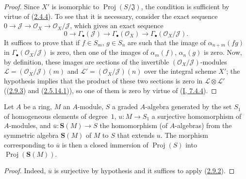 
\begin{proof}
Since $X'$ is isomorphic to $\operatorname{Proj}(S/\mathfrak{J})$, the
condition is sufficient by virtue of (\hyperref[II.2.4.4]{2.4.4}). To see
that it is necessary, consider the exact sequence
$0\to\mathcal{J}\to\mathcal{O}_X\to\mathcal{O}_X/\mathcal{J}$, which gives an
exact sequence
\[
  0\longrightarrow\Gamma_\bullet(\mathcal{J})
  \longrightarrow\Gamma_\bullet(\mathcal{O}_X)
  \longrightarrow\Gamma_\bullet(\mathcal{O}_X/\mathcal{J}).
\]
It suffices to prove that if $f\in S_m$, $g\in S_n$ are such that the image of
$\alpha_{n+m}(fg)$ in $\Gamma_\bullet(\mathcal{O}_X/\mathcal{J})$ is zero,
then one of the images of $\alpha_m(f)$, $\alpha_n(g)$ is zero. Now, by
definition, these images are sections of the invertible
$(\mathcal{O}_X/\mathcal{J})$-modules
$\mathcal{L}=(\mathcal{O}_X/\mathcal{J})(m)$ and
$\mathcal{L}'=(\mathcal{O}_X/\mathcal{J})(n)$ over the integral scheme
$X'$; the hypothesis implies that the product of these two sections is zero
in $\mathcal{L}\otimes\mathcal{L}'$
((\hyperref[II.2.9.3]{2.9.3}) and
(\hyperref[II.2.5.14.1]{2.5.14.1})), so one of them is zero by virtue of
(\hyperref[I.7.4.4]{I, 7.4.4}).
\end{proof}

\begin{corollary}[2.9.5]
\label{II.2.9.5}
Let $A$ be a ring, $M$ an $A$-module, $S$ a graded $A$-algebra generated by
the set $S_1$ of homogeneous elements of degree~$1$, $u:M\to S_1$ a
surjective homomorphism of $A$-modules, and
$\overline{u}:\mathbf{S}(M)\to S$ the homomorphism (of $A$-algebras) from the
symmetric algebra $\mathbf{S}(M)$ of $M$ to $S$ that extends $u$. The
morphism corresponding to $\overline{u}$ is then a closed immersion of
$\operatorname{Proj}(S)$ into $\operatorname{Proj}(\mathbf{S}(M))$.
\end{corollary}

\begin{proof}
Indeed, $\overline{u}$ is surjective by hypothesis and it suffices to apply
(\hyperref[II.2.9.2]{2.9.2}).
\end{proof}

